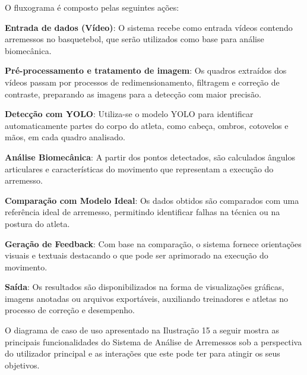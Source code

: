 O fluxograma é composto pelas seguintes ações:

\begin{myitemize}
    \item \textbf{Entrada de dados (Vídeo)}: O sistema recebe como entrada vídeos contendo arremessos no basquetebol, que serão utilizados como base para análise biomecânica.

    \item \textbf{Pré-processamento e tratamento de imagem}: Os quadros extraídos dos vídeos passam por processos de redimensionamento, filtragem e correção de contraste, preparando as imagens para a detecção com maior precisão.

    \item \textbf{Detecção com YOLO}: Utiliza-se o modelo YOLO para identificar automaticamente partes do corpo do atleta, como cabeça, ombros, cotovelos e mãos, em cada quadro analisado.

    \item \textbf{Análise Biomecânica}: A partir dos pontos detectados, são calculados ângulos articulares e características do movimento que representam a execução do arremesso.

    \item \textbf{Comparação com Modelo Ideal}: Os dados obtidos são comparados com uma referência ideal de arremesso, permitindo identificar falhas na técnica ou na postura do atleta.

    \item \textbf{Geração de Feedback}: Com base na comparação, o sistema fornece orientações visuais e textuais destacando o que pode ser aprimorado na execução do movimento.

    \item \textbf{Saída}: Os resultados são disponibilizados na forma de visualizações gráficas, imagens anotadas ou arquivos exportáveis, auxiliando treinadores e atletas no processo de correção e desempenho.
\end{myitemize}



O diagrama de caso de uso apresentado na Ilustração 15 a seguir mostra as principais funcionalidades do Sistema de Análise de Arremessos sob a perspectiva do utilizador principal e as interações que este pode ter para atingir os seus objetivos.

